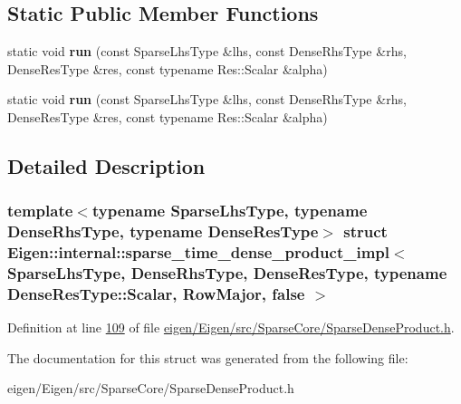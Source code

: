 \subsection*{Static Public Member Functions}
\begin{DoxyCompactItemize}
\item 
\mbox{\label{struct_eigen_1_1internal_1_1sparse__time__dense__product__impl_3_01_sparse_lhs_type_00_01_dense_14133348dce4820dcfa39d8f4e0ae837_a356328893644fecdca125a7de2f64c1d}} 
static void {\bfseries run} (const Sparse\+Lhs\+Type \&lhs, const Dense\+Rhs\+Type \&rhs, Dense\+Res\+Type \&res, const typename Res\+::\+Scalar \&alpha)
\item 
\mbox{\label{struct_eigen_1_1internal_1_1sparse__time__dense__product__impl_3_01_sparse_lhs_type_00_01_dense_14133348dce4820dcfa39d8f4e0ae837_a356328893644fecdca125a7de2f64c1d}} 
static void {\bfseries run} (const Sparse\+Lhs\+Type \&lhs, const Dense\+Rhs\+Type \&rhs, Dense\+Res\+Type \&res, const typename Res\+::\+Scalar \&alpha)
\end{DoxyCompactItemize}


\subsection{Detailed Description}
\subsubsection*{template$<$typename Sparse\+Lhs\+Type, typename Dense\+Rhs\+Type, typename Dense\+Res\+Type$>$\newline
struct Eigen\+::internal\+::sparse\+\_\+time\+\_\+dense\+\_\+product\+\_\+impl$<$ Sparse\+Lhs\+Type, Dense\+Rhs\+Type, Dense\+Res\+Type, typename Dense\+Res\+Type\+::\+Scalar, Row\+Major, false $>$}



Definition at line \hyperlink{eigen_2_eigen_2src_2_sparse_core_2_sparse_dense_product_8h_source_l00109}{109} of file \hyperlink{eigen_2_eigen_2src_2_sparse_core_2_sparse_dense_product_8h_source}{eigen/\+Eigen/src/\+Sparse\+Core/\+Sparse\+Dense\+Product.\+h}.



The documentation for this struct was generated from the following file\+:\begin{DoxyCompactItemize}
\item 
eigen/\+Eigen/src/\+Sparse\+Core/\+Sparse\+Dense\+Product.\+h\end{DoxyCompactItemize}
